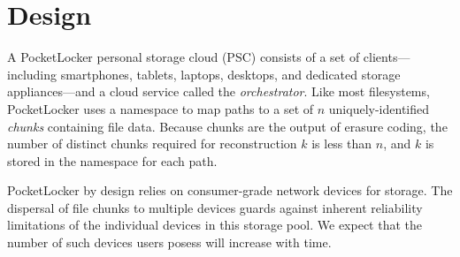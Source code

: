 
\section{Design}
\label{sec-design}

A PocketLocker personal storage cloud (PSC) consists of a set of
clients---including smartphones, tablets, laptops, desktops, and dedicated
storage appliances---and a cloud service called the \textit{orchestrator}.
Like most filesystems, PocketLocker uses a namespace to map paths to a set of
$n$ uniquely-identified \textit{chunks} containing file data. Because chunks
are the output of erasure coding, the number of distinct chunks required for
reconstruction $k$ is less than $n$, and $k$ is stored in the namespace for
each path.

PocketLocker by design relies on consumer-grade network devices for storage.
The dispersal of file chunks to multiple devices guards against inherent
reliability limitations of the individual devices in this storage pool. We
expect that the number of such devices users posess will increase with time.


